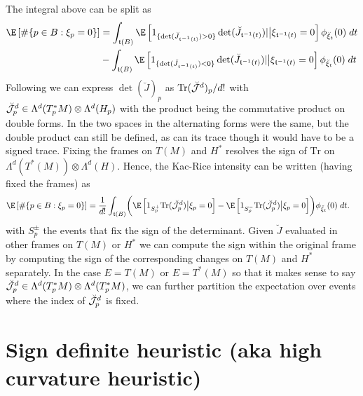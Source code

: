 \documentclass{article}
\newcommand{\randsec}{\xi}
\begin{document}
The integral above can be split as
$$
\begin{aligned}
\E \left[\# \{p \in B: \randsec_p=0\} \right] &= \int_{\coordchart(B)} \E \left[1_{\{\det(\breve{J}_{\coordchart^{-1}(t)}) > 0\}}\det(\breve{J}_{\coordchart^{-1}(t)})| \bigr | \randsec_{\coordchart^{-1}(t)}=0 \right] \phi_{\breve{\randsec}_t}(0) \; dt \\
& - \int_{\coordchart(B)} \E \left[1_{\{\det(\breve{J}_{\coordchart^{-1}(t)}) < 0\}}\det(\breve{J}_{\coordchart^{-1}(t)})| \bigr | \randsec_{\coordchart^{-1}(t)}=0 \right] \phi_{\breve{\randsec}_t}(0) \; dt \\
\end{aligned}
$$
Following \cite{ECmanifolds,Federer} we can express $\det(\breve{J})_p$ as $\text{Tr}(\breve{\cal J}^d)_p/d!$
with $\breve{\cal J}^d_p \in \Lambda^d(T^*_pM) \otimes \Lambda^d(H_p)$ with the product being
the commutative product on double forms. In \cite{ECmanifolds,Federer} the two spaces in the alternating
forms were the same, but the double product can still be defined, as can its trace though it would have to be
a signed trace. Fixing the frames on $T(M)$ and $H^*$ resolves the sign of $\text{Tr}$ on
$\Lambda^d(T^*(M)) \otimes \Lambda^d(H)$. Hence, the
Kac-Rice intensity can be written (having fixed the frames) as
$$
\begin{aligned}
\E \left[\# \{p \in B: \randsec_p=0\} \right] &= \frac{1}{d!} \int_{\coordchart(B)} \biggl( \E \left[1_{S^+_p} \text{Tr}(\breve{\cal J}_p^d) \bigl| \randsec_p=0\right]   - \E \left[1_{S^-_p} \text{Tr}(\breve{\cal J}_p^d) \bigl| \randsec_p=0\right] \biggr) \phi_{\breve{\randsec}_t}(0) \; dt.
\end{aligned}
$$
with $S^{\pm}_p$ the events that fix the sign of the determinant.
Given $\breve{J}$ evaluated in other frames on $T(M)$ or $H^*$ we can compute the sign within the original frame by computing the sign of the corresponding changes on $T(M)$ and $H^*$ separately.
In the case $E=T(M)$ or $E=T^*(M)$ so that
it makes sense to say $\breve{\cal J}^d_p \in \Lambda^d(T^*_pM) \otimes \Lambda^d(T^*_pM)$, we can further partition the expectation over events where the index of $\breve{\cal J}^d_p$ is fixed.

\section{Sign definite heuristic (aka high curvature heuristic)}
\end{document}
